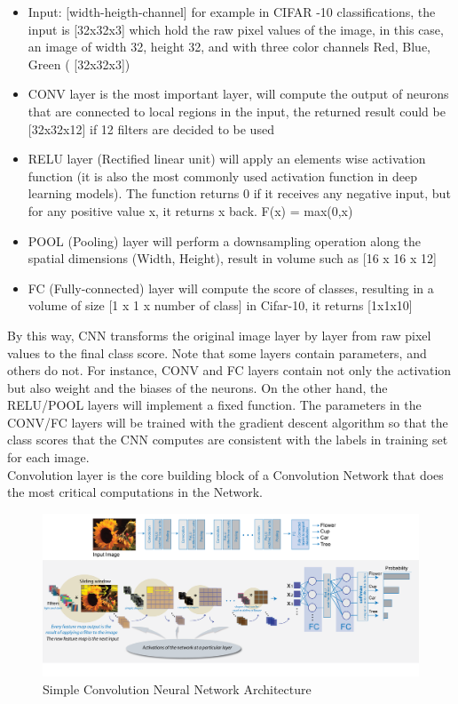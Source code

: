 \begin{itemize}
	\item Input: [width-heigth-channel] for example in CIFAR -10 classifications, the input is [32x32x3] which hold the raw pixel values of the image, in this case, an image of width 32, height 32, and with three color channels Red, Blue, Green ( [32x32x3])
	\item CONV layer is the most important layer, will compute the output of neurons that are connected to local regions in the input, the returned result could be [32x32x12] if 12 filters are decided to be used 
	\item RELU layer (Rectified linear unit) will apply an elements wise activation function (it is also the most commonly used activation function in deep learning models). The function returns 0 if it receives any negative input, but for any positive value x, it returns x back. F(x) = max(0,x)\\
	\item POOL (Pooling) layer will perform a downsampling operation along the spatial dimensions (Width, Height), result in volume such as [16 x 16 x 12]
	\item FC (Fully-connected) layer will compute the score of classes, resulting in a volume of size [1 x 1 x number of class] in Cifar-10, it returns [1x1x10]
\end{itemize}

By this way, CNN transforms the original image layer by layer from raw pixel values to the final class score. Note that some layers contain parameters, and others do not. For instance, CONV and FC layers contain not only the activation but also weight and the biases of the neurons. On the other hand, the RELU/POOL layers will implement a fixed function. The parameters in the CONV/FC layers will be trained with the gradient descent algorithm so that the class scores that the CNN computes are consistent with the labels in training set for each image.\\

Convolution layer is the core building block of a Convolution Network that does the most critical computations in the Network.
\begin{center}
  \begin{figure}[H]
  \centering
  \includegraphics[width=1\columnwidth]{images/chap2/Intro_CNN.png}
  \caption{Simple Convolution Neural Network Architecture}
  \label{chap2:CNN arch}
  \end{figure}
\end{center}


